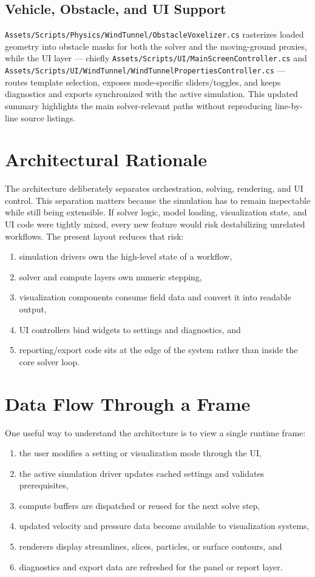 \documentclass[12pt,a4paper,titlepage]{report}
\begin{document}
\subsection{Vehicle, Obstacle, and UI Support}
\texttt{Assets/Scripts/Physics/WindTunnel/ObstacleVoxelizer.cs} rasterizes loaded geometry into obstacle masks for both the solver and the moving-ground proxies, while the UI layer — chiefly \texttt{Assets/Scripts/UI/MainScreenController.cs} and \texttt{Assets/Scripts/UI/WindTunnel/WindTunnelPropertiesController.cs} — routes template selection, exposes mode-specific sliders/toggles, and keeps diagnostics and exports synchronized with the active simulation. This updated summary highlights the main solver-relevant paths without reproducing line-by-line source listings.

\section{Architectural Rationale}
The architecture deliberately separates orchestration, solving, rendering, and UI control. This separation matters because the simulation has to remain inspectable while still being extensible. If solver logic, model loading, visualization state, and UI code were tightly mixed, every new feature would risk destabilizing unrelated workflows. The present layout reduces that risk:
\begin{enumerate}
\item simulation drivers own the high-level state of a workflow,
\item solver and compute layers own numeric stepping,
\item visualization components consume field data and convert it into readable output,
\item UI controllers bind widgets to settings and diagnostics, and
\item reporting/export code sits at the edge of the system rather than inside the core solver loop.
\end{enumerate}

\section{Data Flow Through a Frame}
One useful way to understand the architecture is to view a single runtime frame:
\begin{enumerate}
\item the user modifies a setting or visualization mode through the UI,
\item the active simulation driver updates cached settings and validates prerequisites,
\item compute buffers are dispatched or reused for the next solve step,
\item updated velocity and pressure data become available to visualization systems,
\item renderers display streamlines, slices, particles, or surface contours, and
\item diagnostics and export data are refreshed for the panel or report layer.
\end{enumerate}
\end{document}
